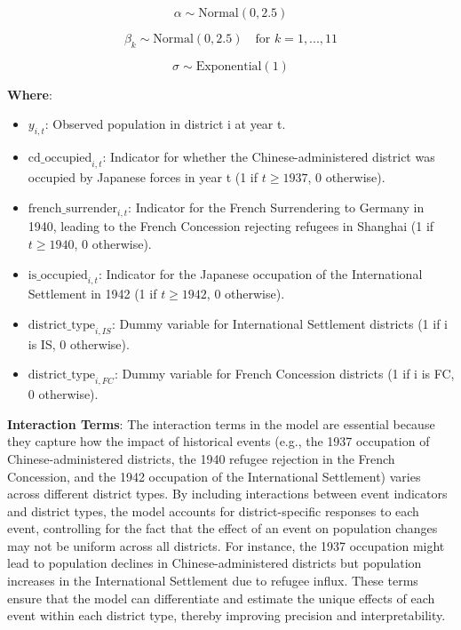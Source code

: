 \documentclass[
  letterpaper,
  DIV=11,
  numbers=noendperiod]{scrartcl}
\providecommand{\tightlist}{%
  \setlength{\itemsep}{0pt}\setlength{\parskip}{0pt}}\usepackage{longtable,booktabs,array}
\begin{document}
\[\alpha \sim \mbox{Normal}(0, 2.5)\]

\[\beta_k \sim \mbox{Normal}(0, 2.5) \quad \mbox{for } k = 1, ..., 11\]

\[\sigma \sim \mbox{Exponential}(1)\]

\textbf{Where}:

\begin{itemize}
\tightlist
\item
  \(y_{i,t}\): Observed population in district i at year t.
\item
  \(\mbox{cd_occupied}_{i,t}\): Indicator for whether the
  Chinese-administered district was occupied by Japanese forces in year
  t (1 if \(t \geq 1937\), 0 otherwise).
\item
  \(\mbox{french_surrender}_{i,t}\): Indicator for the French
  Surrendering to Germany in 1940, leading to the French Concession
  rejecting refugees in Shanghai (1 if \(t \geq 1940\), 0 otherwise).
\item
  \(\mbox{is_occupied}_{i,t}\): Indicator for the Japanese occupation of
  the International Settlement in 1942 (1 if \(t \geq 1942\), 0
  otherwise).
\item
  \(\mbox{district_type}_{i, IS}\): Dummy variable for International
  Settlement districts (1 if i is IS, 0 otherwise).
\item
  \(\mbox{district_type}_{i, FC}\): Dummy variable for French Concession
  districts (1 if i is FC, 0 otherwise).
\end{itemize}

\textbf{Interaction Terms}: The interaction terms in the model are
essential because they capture how the impact of historical events
(e.g., the 1937 occupation of Chinese-administered districts, the 1940
refugee rejection in the French Concession, and the 1942 occupation of
the International Settlement) varies across different district types. By
including interactions between event indicators and district types, the
model accounts for district-specific responses to each event,
controlling for the fact that the effect of an event on population
changes may not be uniform across all districts. For instance, the 1937
occupation might lead to population declines in Chinese-administered
districts but population increases in the International Settlement due
to refugee influx. These terms ensure that the model can differentiate
and estimate the unique effects of each event within each district type,
thereby improving precision and interpretability.
\end{document}
